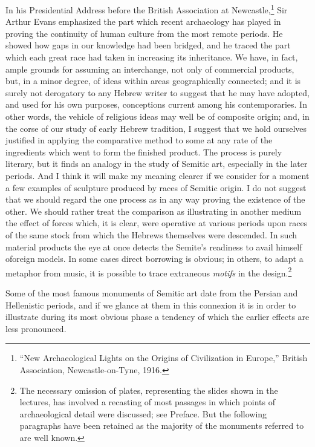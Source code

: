 \documentclass[12pt,oneside]{book}
\begin{document}
In his Presidential Address before the British Association at Newcastle,\footnote{``New Archaeological Lights on the Origins of Civilization in Europe,'' British Association, Newcastle-on-Tyne, 1916.} Sir Arthur Evans emphasized the part which recent archaeology has played in proving the continuity of human culture from the most remote periods. He showed how gaps in our knowledge had been bridged, and he traced the part which each great race had taken in increasing its inheritance. We have, in fact, ample grounds for assuming an interchange, not only of commercial products, but, in a minor degree, of ideas within areas geographically connected; and it is surely not derogatory to any Hebrew writer to suggest that he may have adopted, and used for his own purposes, conceptions current among his contemporaries. In other words, the vehicle of religious ideas may well be of composite origin; and, in the corse of our study of early Hebrew tradition, I suggest that we hold ourselves justified in applying the comparative method to some at any rate of the ingredients which went to form the finished product. The process is purely literary, but it finds an analogy in the study of Semitic art, especially in the later periods. And I think it will make my meaning clearer if we consider for a moment a few examples of sculpture produced by races of Semitic origin. I do not suggest that we should regard the one process as in any way proving the existence of the other. We should rather treat the comparison as illustrating in another medium the effect of forces which, it is clear, were operative at various periods upon races of the same stock from which the Hebrews themselves were descended. In such material products the eye at once detects the Semite's readiness to avail himself oforeign models. In some cases direct borrowing is obvious; in others, to adapt a metaphor from music, it is possible to trace extraneous \textit{motifs} in the design.\footnote{The necessary omission of plates, representing the slides shown in the lectures, has involved a recasting of most passages in which points of archaeological detail were discussed; see Preface. But the following paragraphs have been retained as the majority of the monuments referred to are well known.} \par 

Some of the most famous monuments of Semitic art date from the Persian and Hellenistic periods, and if we glance at them in this connexion it is in order to illustrate during its most obvious phase a tendency of which the earlier effects are less pronounced.  
\end{document}
